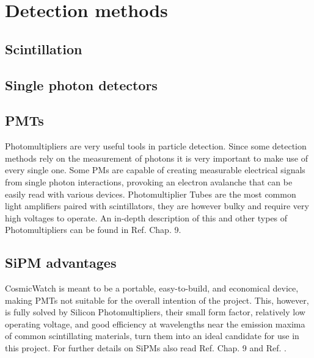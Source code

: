 \chapter{Detection methods} \label{chap:detection_methods}

\section{Scintillation}

\section{Single photon detectors}

\section{PMTs}

Photomultipliers are very useful tools in particle detection. Since some detection methods rely on the measurement of photons it is very important to make use of every single one. Some PMs are capable of creating measurable electrical signals from single photon interactions, provoking an electron avalanche that can be easily read with various devices. Photomultiplier Tubes are the most common light amplifiers paired with scintillators, they are however bulky and require very high voltages to operate. An in-depth description of this and other types of Photomultipliers can be found in Ref. \cite{knoll2010radiation} Chap. 9.

\section{SiPM advantages}

CosmicWatch is meant to be a portable, easy-to-build, and economical device, making PMTs not suitable for the overall intention of the project. This, however, is fully solved by Silicon Photomultipliers, their small form factor, relatively low operating voltage, and good efficiency at wavelengths near the emission maxima of common scintillating materials, turn them into an ideal candidate for use in this project. For further details on SiPMs also read Ref. \cite{knoll2010radiation} Chap. 9 and Ref. \cite{Onsemi_SiPM_intro}.

